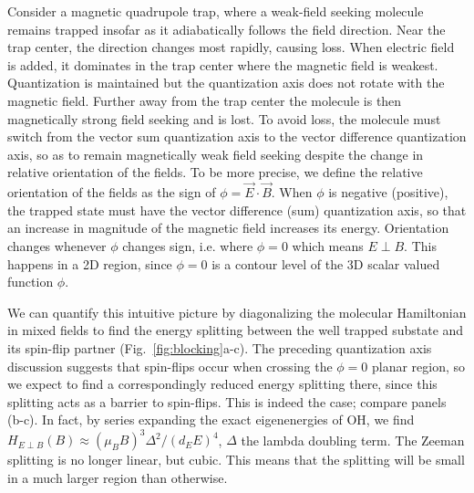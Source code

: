 \documentclass[%
 reprint,
 amsmath,amssymb,
 aps,
prl,
]{revtex4-1}
\newcommand{\epb}{{$E\!\perp\!B$}}
\newcommand{\epbm}{{E\!\perp\!B}}
\begin{document}

Consider a magnetic quadrupole trap, where a weak-field seeking molecule remains trapped insofar as it adiabatically follows the field direction. Near the trap center, the direction changes most rapidly, causing loss. When electric field is added, it dominates in the trap center where the magnetic field is weakest. Quantization is maintained but the quantization axis does not rotate with the magnetic field. Further away from the trap center the molecule is then magnetically strong field seeking and is lost. To avoid loss, the molecule must switch from the vector sum quantization axis to the vector difference quantization axis, so as to remain magnetically weak field seeking despite the change in relative orientation of the fields. To be more precise, we define the relative orientation of the fields as the sign of $\phi=\vec{E}\cdot\vec{B}$. When $\phi$ is negative (positive), the trapped state must have the vector difference (sum) quantization axis, so that an increase in magnitude of the magnetic field increases its energy. Orientation changes whenever $\phi$ changes sign, i.e. where $\phi=0$ which means \epb. This happens in a 2D region, since $\phi=0$ is a contour level of the 3D scalar valued function $\phi$. 


We can quantify this intuitive picture by diagonalizing the molecular Hamiltonian in mixed fields to find the energy splitting between the well trapped substate and its spin-flip partner (Fig.~\ref{fig:blocking}a-c). The preceding quantization axis discussion suggests that spin-flips occur when crossing the $\phi=0$ planar region, so we expect to find a correspondingly reduced energy splitting there, since this splitting acts as a barrier to spin-flips. This is indeed the case; compare panels (b-c). In fact, by series expanding the exact eigenenergies of OH, we find $H_\epbm(B)\approx (\mu_BB)^3\Delta^2/(d_EE)^4$, $\Delta$ the lambda doubling term. The Zeeman splitting is no longer linear, but cubic. This means that the splitting will be small in a much larger region than otherwise.

\end{document}
